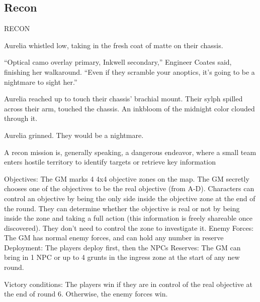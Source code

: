 \subsection{Recon}

RECON

         Aurelia whistled low, taking in the fresh coat of matte on their chassis.

          “Optical camo overlay primary, Inkwell secondary,” Engineer Coates said, finishing her walkaround.
          “Even if they scramble your anoptics, it’s going to be a nightmare to sight her.”

         Aurelia reached up to touch their chassis’ brachial mount. Their sylph spilled across their arm,
         touched the chassis. An inkbloom of the midnight color clouded through it.

         Aurelia grinned. They would be a nightmare.

A recon mission is, generally speaking, a dangerous endeavor, where a small team enters hostile
territory to identify targets or retrieve key information

Objectives: The GM marks 4 4x4 objective zones on the map. The GM secretly chooses one of
the objectives to be the real objective (from A-D). Characters can control an objective by being the
only side inside the objective zone at the end of the round. They can determine whether the
objective is real or not by being inside the zone and taking a full action (this information is freely
shareable once discovered). They don’t need to control the zone to investigate it.
Enemy Forces: The GM has normal enemy forces, and can hold any number in reserve
Deployment: The players deploy first, then the NPCs
Reserves: The GM can bring in 1 NPC or up to 4 grunts in the ingress zone at the start of any
new round.




Victory conditions: The players win if they are in control of the real objective at the end of round
6. Otherwise, the enemy forces win.

